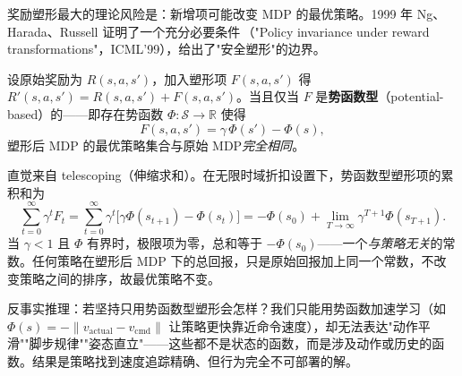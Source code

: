 奖励塑形最大的理论风险是：新增项可能改变 MDP 的最优策略。1999 年 Ng、Harada、Russell 证明了一个充分必要条件\,\cite{ng1999shaping}（"Policy invariance under reward transformations"，ICML'99），给出了"安全塑形"的边界。

\begin{theorem}\label{thm:rlmc-rew-pbrs}
设原始奖励为 $R(s,a,s')$，加入塑形项 $F(s,a,s')$ 得 $R'(s,a,s')=R(s,a,s')+F(s,a,s')$。当且仅当 $F$ 是\textbf{势函数型}（potential-based）的——即存在势函数 $\Phi:\mathcal S\to\mathbb R$ 使得
\begin{equation}
F(s,a,s')=\gamma\,\Phi(s')-\Phi(s),
\label{eq:rlmc-rew-pbrs}
\end{equation}
塑形后 MDP 的最优策略集合与原始 MDP\emph{完全相同}。
\end{theorem}

\begin{derivation}
直觉来自 telescoping（伸缩求和）。在无限时域折扣设置下，势函数型塑形项的累积和为
\begin{equation}
\sum_{t=0}^{\infty}\gamma^{t}F_t=\sum_{t=0}^{\infty}\gamma^{t}\big[\gamma\Phi(s_{t+1})-\Phi(s_t)\big]
=-\Phi(s_0)+\lim_{T\to\infty}\gamma^{T+1}\Phi(s_{T+1}).
\label{eq:rlmc-rew-telescope}
\end{equation}
当 $\gamma<1$ 且 $\Phi$ 有界时，极限项为零，总和等于 $-\Phi(s_0)$——一个\emph{与策略无关}的常数。任何策略在塑形后 MDP 下的总回报，只是原始回报加上同一个常数，不改变策略之间的排序，故最优策略不变。
\end{derivation}


反事实推理：若坚持只用势函数型塑形会怎样？我们只能用势函数加速学习（如 $\Phi(s)=-\lVert v_{\text{actual}}-v_{\text{cmd}}\rVert$ 让策略更快靠近命令速度），却无法表达"动作平滑""脚步规律""姿态直立"——这些都不是状态的函数，而是涉及动作或历史的函数。结果是策略找到速度追踪精确、但行为完全不可部署的解。

